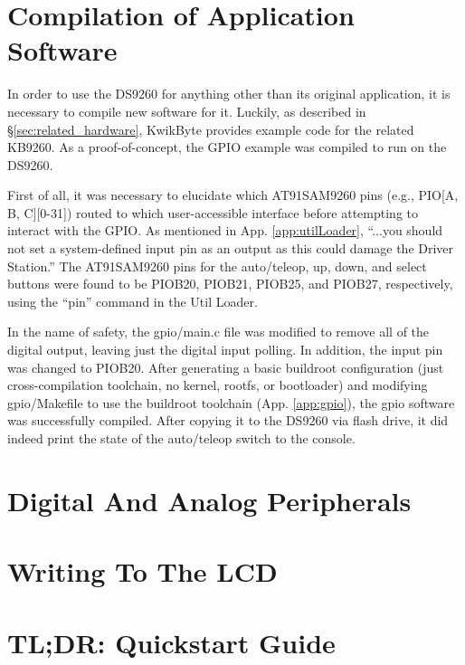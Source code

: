 \documentclass[]{article}
\begin{document}
\section{Compilation of Application Software}
\par In order to use the DS9260 for anything other than its original application, it is necessary to compile new software for it. Luckily, as described in \S\ref{sec:related_hardware}, KwikByte provides example code for the related KB9260. As a proof-of-concept, the GPIO example was compiled to run on the DS9260.
\par First of all, it was necessary to elucidate which AT91SAM9260 pins (e.g., PIO[A, B, C][0-31]) routed to which user-accessible interface before attempting to interact with the GPIO. As mentioned in App. \ref{app:utilLoader}, ``...you should not set a system-defined input pin as an output as this could damage the Driver Station.'' The AT91SAM9260 pins for the auto/teleop, up, down, and select buttons were found to be PIOB20, PIOB21, PIOB25, and PIOB27, respectively, using the ``pin'' command in the Util Loader. 
\par In the name of safety, the gpio/main.c file was modified to remove all of the digital output, leaving just the digital input polling. In addition, the input pin was changed to PIOB20. After generating a basic buildroot configuration (just cross-compilation toolchain, no kernel, rootfs, or bootloader) and modifying gpio/Makefile to use the buildroot toolchain (App. \ref{app:gpio}), the gpio software was successfully compiled. After copying it to the DS9260 via flash drive, it did indeed print the state of the auto/teleop switch to the console.

\section{Digital And Analog Peripherals}
\section{Writing To The LCD}
\section{TL;DR: Quickstart Guide}
\end{document}
